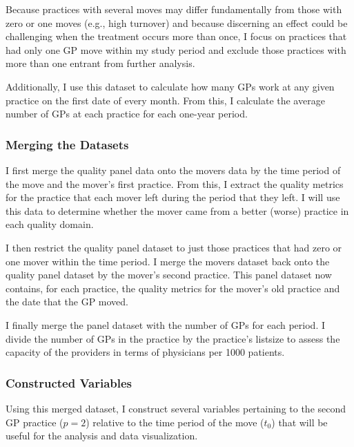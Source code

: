 \documentclass[11pt]{article}
\begin{document}
Because practices with several moves may differ fundamentally from those with zero or one moves (e.g., high turnover) and because discerning an effect could be challenging when the treatment occurs more than once, I focus on practices that had only one GP move within my study period and exclude those practices with more than one entrant from further analysis.

Additionally, I use this dataset to calculate how many GPs work at any given practice on the first date of every month. From this, I calculate the average number of GPs at each practice for each one-year period.

\subsubsection{Merging the Datasets}
I first merge the quality panel data onto the movers data by the time period of the move and the mover's first practice. From this, I extract the quality metrics for the practice that each mover left during the period that they left. I will use this data to determine whether the mover came from a better (worse) practice in each quality domain.

I then restrict the quality panel dataset to just those practices that had zero or one mover within the time period. I merge the movers dataset back onto the quality panel dataset by the mover's second practice. This panel dataset now contains, for each practice, the quality metrics for the mover's old practice and the date that the GP moved.

I finally merge the panel dataset with the number of GPs for each period. I divide the number of GPs in the practice by the practice's listsize to assess the capacity of the providers in terms of physicians per 1000 patients.


\subsubsection{Constructed Variables}

Using this merged dataset, I construct several variables pertaining to the second GP practice ($p=2$) relative to the time period of the move ($t_0$) that will be useful for the analysis and data visualization.
\end{document}
